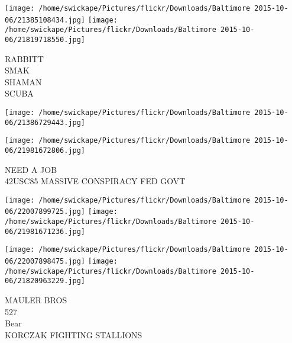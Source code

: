 \documentclass[10pt,letterpaper]{article}
\begin{document}
\texttt{[image: /home/swickape/Pictures/flickr/Downloads/Baltimore 2015-10-06/21385108434.jpg]}
\texttt{[image: /home/swickape/Pictures/flickr/Downloads/Baltimore 2015-10-06/21819718550.jpg]}

RABBITT\\
SMAK\\
SHAMAN\\
SCUBA
\pagebreak

\texttt{[image: /home/swickape/Pictures/flickr/Downloads/Baltimore 2015-10-06/21386729443.jpg]}

\vspace{0.25in}
\texttt{[image: /home/swickape/Pictures/flickr/Downloads/Baltimore 2015-10-06/21981672806.jpg]}

NEED A JOB\\
42USC85 MASSIVE CONSPIRACY FED GOVT
\pagebreak

\texttt{[image: /home/swickape/Pictures/flickr/Downloads/Baltimore 2015-10-06/22007899725.jpg]}
\texttt{[image: /home/swickape/Pictures/flickr/Downloads/Baltimore 2015-10-06/21981671236.jpg]}

\texttt{[image: /home/swickape/Pictures/flickr/Downloads/Baltimore 2015-10-06/22007898475.jpg]}
\texttt{[image: /home/swickape/Pictures/flickr/Downloads/Baltimore 2015-10-06/21820963229.jpg]}

MAULER BROS\\
527\\
Bear\\
KORCZAK FIGHTING STALLIONS
\pagebreak
\end{document}
